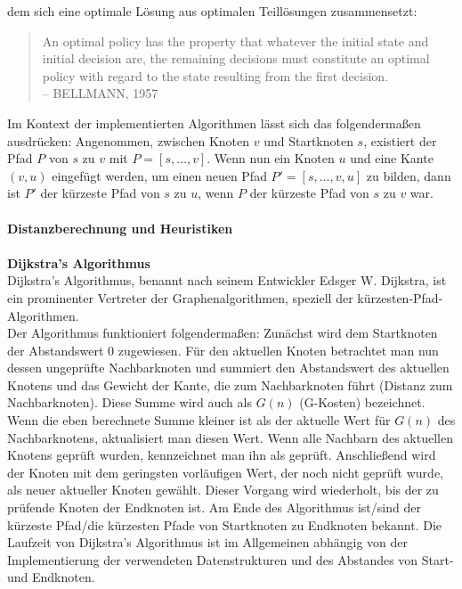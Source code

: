 \begin{itemize}
    dem sich eine optimale Lösung aus optimalen Teillösungen zusammensetzt:
    \begin{quotation}
    An optimal policy has the property that whatever the initial state and initial decision are, the remaining decisions
    must constitute an optimal policy with regard to the state resulting from the first decision.\\
    -- BELLMANN, 1957 \cite{bellman2010}
    \end{quotation}
    Im Kontext der implementierten Algorithmen lässt sich das folgendermaßen ausdrücken:
    Angenommen, zwischen Knoten $v$ und Startknoten $s$, existiert der Pfad $P$ von $s$ zu $v$ mit $P = [s, \dots, v]$.
    Wenn nun ein Knoten $u$ und eine Kante $(v, u)$ eingefügt werden, um einen neuen Pfad $P' = [s, \dots, v, u]$ zu
    bilden, dann ist $P'$ der kürzeste Pfad von $s$ zu $u$, wenn $P$ der kürzeste Pfad von $s$ zu $v$ war. \\\\
    \textbf{Distanzberechnung und Heuristiken}\\\\
    \textbf{Dijkstra's Algorithmus}\\
    Dijkstra's Algorithmus, benannt nach seinem Entwickler Edsger W. Dijkstra, ist ein prominenter Vertreter der Graphenalgorithmen,
    speziell der kürzesten-Pfad-Algorithmen. \cite{dijkstra1959}\\
    Der Algorithmus funktioniert folgendermaßen: Zunächst wird dem Startknoten der Abstandswert $0$ zugewiesen.
    Für den aktuellen Knoten betrachtet man nun dessen ungeprüfte Nachbarknoten und summiert den Abstandswert des aktuellen
    Knotens und das Gewicht der Kante, die zum Nachbarknoten führt (Distanz zum Nachbarknoten).
    Diese Summe wird auch als $G(n)$ (G-Kosten) bezeichnet.
    Wenn die eben berechnete Summe kleiner ist als der aktuelle Wert für $G(n)$ des Nachbarknotens, aktualisiert man diesen Wert.
    Wenn alle Nachbarn des aktuellen Knotens geprüft wurden, kennzeichnet man ihn als geprüft.
    Anschließend wird der Knoten mit dem geringsten vorläufigen Wert, der noch nicht geprüft wurde, als neuer aktueller Knoten gewählt.
    Dieser Vorgang wird wiederholt, bis der zu prüfende Knoten der Endknoten ist.
    Am Ende des Algorithmus ist/sind der kürzeste Pfad/die kürzesten Pfade von Startknoten zu Endknoten bekannt.
    Die Laufzeit von Dijkstra's Algorithmus ist im Allgemeinen abhängig von der Implementierung der verwendeten Datenstrukturen
    und des Abstandes von Start- und Endknoten. \cite{dijkstra1959}

\end{itemize}
